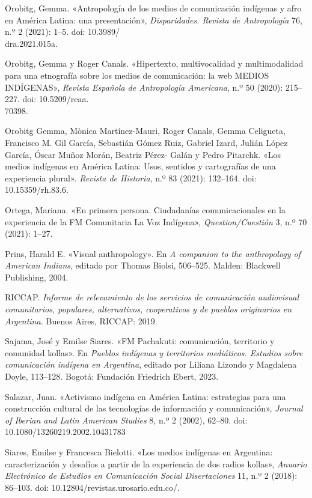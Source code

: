 \documentclass{tufte-handout}
\begin{document}
\begin{hangparas}{.25in}{1}
Orobitg, Gemma. «Antropología de los medios de comunicación indígenas y
afro en América Latina: una presentación», \emph{Disparidades. Revista
de Antropología} 76, n.º 2 (2021): 1--5. doi: 10.3989/\\\hspace{.267in}dra.2021.015a.

Orobitg, Gemma y Roger Canals. «Hipertexto, multivocalidad y
multimodalidad para una etnografía sobre los medios de comunicación: la
web MEDIOS INDÍGENAS», \emph{Revista Española de Antropología
Americana}, n.º 50 (2020): 215--227. doi: 10.5209/reaa.\\\hspace{.267in}70398.

Orobitg Gemma, Mònica Martínez-Mauri, Roger Canals, Gemma Celigueta,
Francisco M. Gil García, Sebastián Gómez Ruiz, Gabriel Izard, Julián
López García, Óscar Muñoz Morán, Beatriz Pérez- Galán y Pedro Pitarchk.
«Los medios indígenas en América Latina: Usos, sentidos y cartografías
de una experiencia plural». \emph{Revista de Historia}, n.º 83 (2021):
132--164. doi: 10.15359/rh.83.6.

Ortega, Mariana. «En primera persona. Ciudadanías comunicacionales en la
experiencia de la FM Comunitaria La Voz Indígena»,
\emph{Question/Cuestión} 3, n.º 70 (2021): 1--27.

Prins, Harald E. «Visual anthropology». En \emph{A companion to the
anthropology of American Indians}, editado por Thomas Biolsi, 506--525.
Malden: Blackwell Publishing, 2004.

RICCAP. \emph{Informe de relevamiento de los servicios de comunicación
audiovisual comunitarios, populares, alternativos, cooperativos y de
pueblos originarios en Argentina.} Buenos Aires, RICCAP: 2019.

Sajama, José y Emilse Siares. «FM Pachakuti: comunicación, territorio y
comunidad kollas». En \emph{Pueblos indígenas y territorios mediáticos.
Estudios sobre comunicación indígena en Argentina}, editado por Liliana
Lizondo y Magdalena Doyle, 113--128. Bogotá: Fundación Friedrich Ebert,
2023.

Salazar, Juan. «Activismo indígena en América Latina: estrategias para
una construcción cultural de las tecnologías de información y
comunicación», \emph{Journal of Iberian and Latin American Studies} 8,
n.º 2 (2002), 62--80. doi: 10.1080/13260219.2002.10431783

Siares, Emilse y Francesca Bielotti. «Los medios indígenas en Argentina:
caracterización y desafíos a partir de la experiencia de dos radios
kollas», \emph{Anuario Electrónico de Estudios en Comunicación Social
Disertaciones} 11, n.º 2 (2018): 86--103. doi:
10.12804/revistas.urosario.edu.co/.


\end{hangparas}
\end{document}
